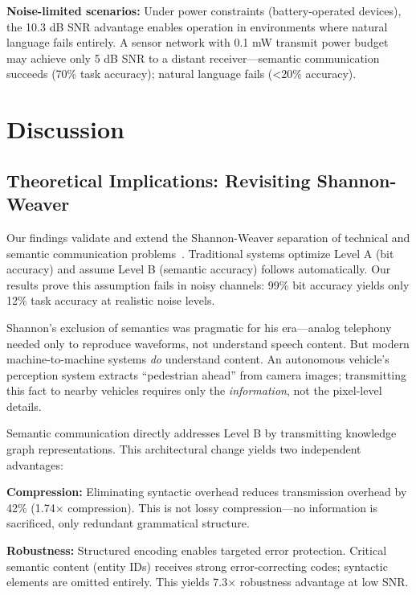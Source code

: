 \documentclass[conference]{IEEEtran}
\begin{document}
\textbf{Noise-limited scenarios:} Under power constraints (battery-operated 
devices), the 10.3 dB SNR advantage enables operation in environments 
where natural language fails entirely. A sensor network with 0.1 mW transmit 
power budget may achieve only 5 dB SNR to a distant receiver—semantic 
communication succeeds (70\% task accuracy); natural language fails (<20\% 
accuracy).

\section{Discussion}

\subsection{Theoretical Implications: Revisiting Shannon-Weaver}

Our findings validate and extend the Shannon-Weaver separation of technical 
and semantic communication problems~\cite{Shannon1948,Weaver1949}. Traditional 
systems optimize Level A (bit accuracy) and assume Level B (semantic 
accuracy) follows automatically. Our results prove this assumption fails 
in noisy channels: 99\% bit accuracy yields only 12\% task accuracy at 
realistic noise levels.

Shannon's exclusion of semantics was pragmatic for his era—analog telephony 
needed only to reproduce waveforms, not understand speech content. But 
modern machine-to-machine systems \textit{do} understand content. An 
autonomous vehicle's perception system extracts ``pedestrian ahead'' 
from camera images; transmitting this fact to nearby vehicles requires 
only the \textit{information}, not the pixel-level details.

Semantic communication directly addresses Level B by transmitting knowledge 
graph representations. This architectural change yields two independent 
advantages:

\textbf{Compression:} Eliminating syntactic overhead reduces transmission 
overhead by 42\% (1.74× compression). This is not lossy compression—no 
information is sacrificed, only redundant grammatical structure.

\textbf{Robustness:} Structured encoding enables targeted error protection. 
Critical semantic content (entity IDs) receives strong error-correcting 
codes; syntactic elements are omitted entirely. This yields 7.3× robustness 
advantage at low SNR.
\end{document}
